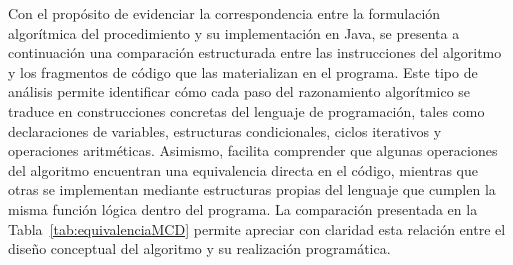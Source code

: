 \documentclass[12pt,twoside]{book}
\begin{document}
					\noindent
					Con el propósito de evidenciar la correspondencia entre la formulación algorítmica del procedimiento y su implementación en Java, se presenta a continuación una comparación estructurada entre las instrucciones del algoritmo y los fragmentos de código que las materializan en el programa. Este tipo de análisis permite identificar cómo cada paso del razonamiento algorítmico se traduce en construcciones concretas del lenguaje de programación, tales como declaraciones de variables, estructuras condicionales, ciclos iterativos y operaciones aritméticas. Asimismo, facilita comprender que algunas operaciones del algoritmo encuentran una equivalencia directa en el código, mientras que otras se implementan mediante estructuras propias del lenguaje que cumplen la misma función lógica dentro del programa. La comparación presentada en la Tabla~\ref{tab:equivalenciaMCD} permite apreciar con claridad esta relación entre el diseño conceptual del algoritmo y su realización programática.
					
\end{document}
